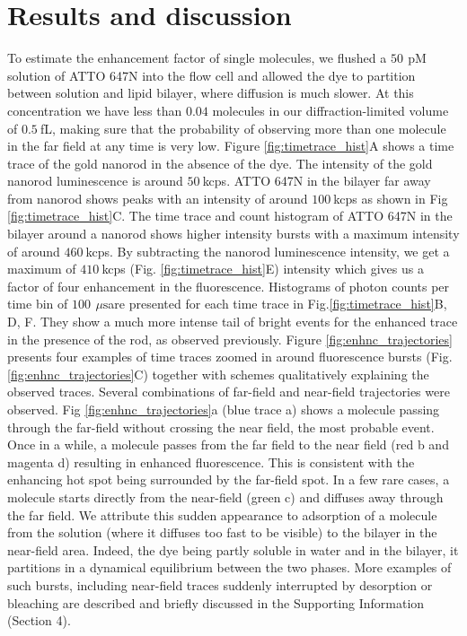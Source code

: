 \documentclass[journal=jpccck,manuscript=article]{achemso}
\newcommand{\pM}{\ensuremath{\,\textrm{pM}}}
\newcommand{\us}{\ensuremath{\,\mu\textrm{s}}}
\begin{document}
\section{Results and discussion}
To estimate the enhancement factor of single molecules, we flushed a $50~$\pM solution of ATTO 647N into the flow cell and allowed the dye to partition between solution and lipid bilayer, where diffusion is much slower. At this concentration we have less than $0.04$ molecules in our diffraction-limited volume of $0.5~$fL, making sure that the probability of observing more than one molecule in the far field at any time is very low. Figure \ref{fig:timetrace_hist}A shows a time trace of the gold nanorod in the absence of the dye. The intensity of the gold nanorod luminescence is around $50~$kcps. ATTO 647N in the bilayer far away from nanorod shows peaks with an intensity of around $100~$kcps as shown in Fig \ref{fig:timetrace_hist}C. The time trace and count histogram of ATTO 647N in the bilayer around a nanorod shows higher intensity bursts with a maximum intensity of around $460~$kcps. By subtracting the nanorod luminescence intensity, we get a maximum of $410~$kcps (Fig. \ref{fig:timetrace_hist}E) intensity which gives us a factor of four enhancement in the fluorescence. Histograms of photon counts per time bin of $100~$\us are presented for each time trace in Fig.\ref{fig:timetrace_hist}B, D, F. They show a much more intense tail of bright events for the enhanced trace in the presence of the rod, as observed previously.\cite{khatua2014resonant} Figure \ref{fig:enhnc_trajectories} presents four examples of time traces zoomed in around fluorescence bursts (Fig. \ref{fig:enhnc_trajectories}C) together with schemes qualitatively explaining the observed traces. Several combinations of far-field and near-field trajectories were observed. Fig \ref{fig:enhnc_trajectories}a (blue trace a) shows a molecule passing through the far-field without crossing the near field, the most probable event. Once in a while, a molecule passes from the far field to the near field (red b and magenta d) resulting in enhanced fluorescence. This is consistent with the enhancing hot spot being surrounded by the far-field spot. In a few rare cases, a molecule starts directly from the near-field (green c) and diffuses away through the far field. We attribute this sudden appearance to adsorption of a molecule from the solution (where it diffuses too fast to be visible) to the bilayer in the near-field area. Indeed, the dye being partly soluble in water and in the bilayer, it partitions in a dynamical equilibrium between the two phases. More examples of such bursts, including near-field traces suddenly interrupted by desorption or bleaching are described and briefly discussed in the Supporting Information (Section 4).\\
\end{document}
